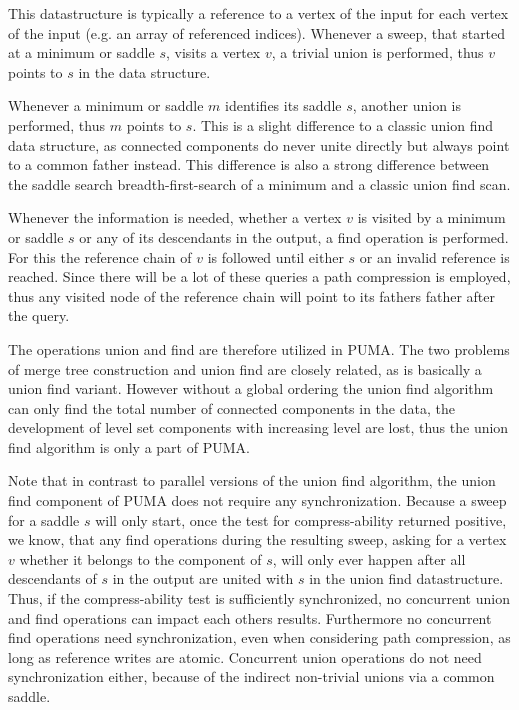 \documentclass{scrartcl}
\begin{document}
This datastructure is typically a reference to a vertex of the input for each vertex of the input (e.g. an array of referenced indices). Whenever a sweep, that started at a minimum or saddle \(s\), visits a vertex \(v\), a trivial union is performed, thus \(v\) points to \(s\) in the data structure. 

Whenever a minimum or saddle \(m\) identifies its saddle \(s\), another union is performed, thus \(m\) points to \(s\). This is a slight difference to a classic union find data structure, as connected components do never unite directly but always point to a common father instead. This difference is also a strong difference between the saddle search breadth-first-search of a minimum and a classic union find scan.

Whenever the information is needed, whether a vertex \(v\) is visited by a minimum or saddle \(s\) or any of its descendants in the output, a find operation is performed. For this the reference chain of \(v\) is followed until either \(s\) or an invalid reference is reached. Since there will be a lot of these queries a path compression is employed, thus any visited node of the reference chain will point to its fathers father after the query.

The operations union and find are therefore utilized in PUMA. The two problems of merge tree construction and union find are closely related, as \cite{pascucci1} is basically a union find variant. However without a global ordering the union find algorithm can only find the total number of connected components in the data, the development of level set components with increasing level are lost, thus the union find algorithm is only a part of PUMA.

Note that in contrast to parallel versions of the union find algorithm, the union find component of PUMA does not require any synchronization. Because a sweep for a saddle \(s\) will only start, once the test for compress-ability returned positive, we know, that any find operations during the resulting sweep, asking for a vertex \(v\) whether it belongs to the component of \(s\), will only ever happen after all descendants of \(s\) in the output are united with \(s\) in the union find datastructure. Thus, if the compress-ability test is sufficiently synchronized, no concurrent union and find operations can impact each others results. Furthermore no concurrent find operations need synchronization, even when considering path compression, as long as reference writes are atomic. Concurrent union operations do not need synchronization either, because of the indirect non-trivial unions via a common saddle.
\end{document}
